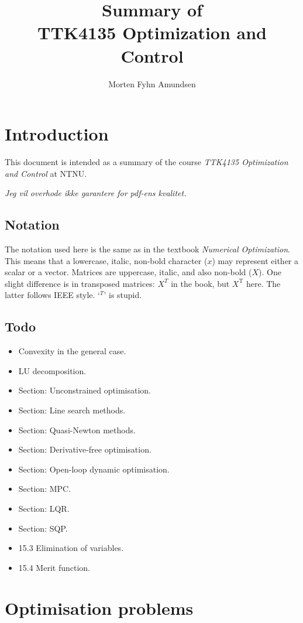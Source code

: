 \documentclass[a4paper, 12pt]{article}
\title{Summary of\\TTK4135 Optimization and Control}
\author{Morten Fyhn Amundsen}
\affil{NTNU}
\theoremstyle{definition}
\newcommand{\T}{^{\scriptscriptstyle \text{T}}}
\begin{document}
\maketitle
\tableofcontents
\newpage

\section{Introduction}
This document is intended as a summary of the course \emph{TTK4135 Optimization and Control} at NTNU.

\emph{Jeg vil overhode ikke garantere for pdf-ens kvalitet.}
\subsection{Notation}
The notation used here is the same as in the textbook \emph{Numerical Optimization}. This means that a lowercase, italic, non-bold character (\(x\)) may represent either a scalar or a vector. Matrices are uppercase, italic, and also non-bold (\(X\)). One slight difference is in transposed matrices: \(X^T\) in the book, but \(X\T\) here. The latter follows IEEE style. `\(^T\)' is stupid.
\subsection{Todo}
\begin{itemize}
	\item Convexity in the general case.
	\item LU decomposition.
	\item Section: Unconstrained optimisation.
	\item Section: Line search methods.
	\item Section: Quasi-Newton methods.
	\item Section: Derivative-free optimisation.
	\item Section: Open-loop dynamic optimisation.
	\item Section: MPC.
	\item Section: LQR.
	\item Section: SQP.
	\item 15.3 Elimination of variables.
	\item 15.4 Merit function.
\end{itemize}
\section{Optimisation problems}
\end{document}
